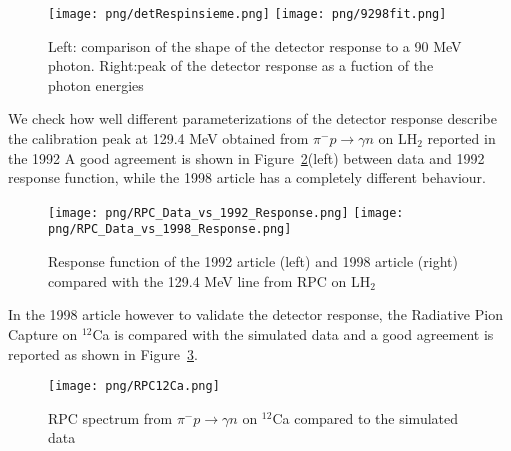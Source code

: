 \begin{figure} [!h]
\centering
\texttt{[image: png/detRespinsieme.png]}
\texttt{[image: png/9298fit.png]}
\caption{Left: comparison of the shape of the detector response to a 90 MeV photon. Right:peak of the detector response as a fuction of the photon energies }
\label{fig:shapecomp} 
\end{figure}

We check how well different parameterizations of the detector response describe the 
calibration peak at 129.4 MeV obtained from $\pi^{-}p \rightarrow \gamma n$ on LH$_{2}$ reported in the 1992 
A good agreement is shown in Figure~\ref{p004}(left) between data and  1992 response function, while the 1998 article has a completely different behaviour.\\

\begin{figure}[!h]
 \begin{center}
 \texttt{[image: png/RPC\_Data\_vs\_1992\_Response.png]} 
 \texttt{[image: png/RPC\_Data\_vs\_1998\_Response.png]} 
 \end{center}
 \caption{Response function of the 1992 article (left) and 1998 article (right) compared with the 129.4 MeV line from RPC on LH$_{2}$}
 \label{p004}
 \end{figure}

 In the 1998 article  however to validate  the detector response, the Radiative Pion Capture on $^{12}$Ca  is compared with the simulated data and a good agreement is reported as shown in Figure~\ref{fig:art9}.

\begin{figure}[!h]
 \begin{center}
 \texttt{[image: png/RPC12Ca.png]} 
 \end{center}
 \caption{RPC spectrum from  $\pi^{-}p \rightarrow \gamma n$ on  $^{12}$Ca compared to the simulated data }
 \label{fig:art9}
 \end{figure}
